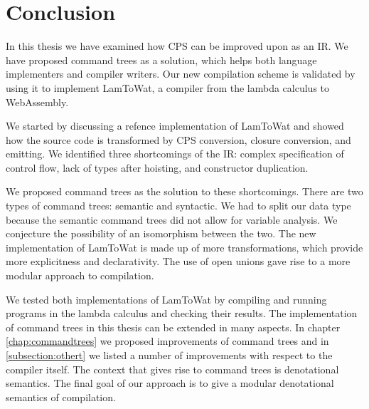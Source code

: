 \chapter{\label{chap:conclusion}Conclusion}

In this thesis we have examined how CPS can be improved upon as an IR. We have proposed command trees as a solution, which helps both language implementers and compiler writers. Our new compilation scheme is validated by using it to implement LamToWat, a compiler from the lambda calculus to WebAssembly. 

We started by discussing a refence implementation of LamToWat and showed how the source code is transformed by CPS conversion, closure conversion, and emitting. We identified three shortcomings of the IR: complex specification of control flow, lack of types after hoisting, and constructor duplication.

We proposed command trees as the solution to these shortcomings. There are two types of command trees: semantic and syntactic. We had to split our data type because the semantic command trees did not allow for variable analysis. We conjecture the possibility of an isomorphism between the two. The new implementation of LamToWat is made up of more transformations, which provide more explicitness and declarativity. The use of open unions gave rise to a more modular approach to compilation.

We tested both implementations of LamToWat by compiling and running programs in the lambda calculus and checking their results. The implementation of command trees in this thesis can be extended in many aspects. In chapter \ref{chap:commandtrees} we proposed improvements of command trees and in \ref{subsection:othert} we listed a number of improvements with respect to the compiler itself. The context that gives rise to command trees is denotational semantics. The final goal of our approach is to give a modular denotational semantics of compilation. 